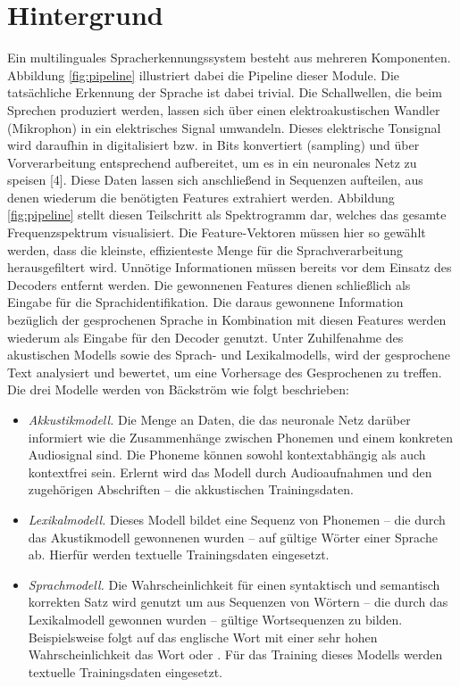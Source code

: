 \section{Hintergrund}
Ein multilinguales Spracherkennungssystem besteht aus mehreren Komponenten. Abbildung \ref{fig:pipeline} illustriert dabei die Pipeline dieser Module. Die tatsächliche Erkennung der Sprache ist dabei trivial. Die Schallwellen, die beim Sprechen produziert werden, lassen sich über einen elektroakustischen Wandler (Mikrophon) in ein elektrisches Signal umwandeln. Dieses elektrische Tonsignal wird daraufhin in digitalisiert bzw. in Bits konvertiert (sampling) und über Vorverarbeitung entsprechend aufbereitet, um es in ein neuronales Netz zu speisen [4]. Diese Daten lassen sich anschließend in Sequenzen aufteilen, aus denen wiederum die benötigten Features extrahiert werden. Abbildung \ref{fig:pipeline} stellt diesen Teilschritt als Spektrogramm dar, welches das gesamte Frequenzspektrum visualisiert. Die Feature-Vektoren müssen hier so gewählt werden, dass die kleinste, effizienteste Menge für die Sprachverarbeitung herausgefiltert wird. Unnötige Informationen müssen bereits vor dem Einsatz des Decoders entfernt werden. Die gewonnenen Features dienen schließlich als Eingabe für die Sprachidentifikation. Die daraus gewonnene Information bezüglich der gesprochenen Sprache in Kombination mit diesen Features werden wiederum als Eingabe für den Decoder genutzt. Unter Zuhilfenahme des akustischen Modells sowie des Sprach- und Lexikalmodells, wird der gesprochene Text analysiert und bewertet, um eine Vorhersage des Gesprochenen zu treffen.
Die drei Modelle werden von Bäckström \cite{Tom.2016} wie folgt beschrieben:

\begin{itemize}
    \item \textit{Akkustikmodell.} Die Menge an Daten, die das neuronale Netz darüber informiert wie die Zusammenhänge zwischen Phonemen und einem konkreten Audiosignal sind. Die Phoneme können
    sowohl kontextabhängig als auch kontextfrei sein.
    Erlernt wird das Modell durch Audioaufnahmen und den zugehörigen Abschriften – die akkustischen Trainingsdaten.
    \item \textit{Lexikalmodell.} Dieses Modell bildet eine Sequenz von Phonemen – die durch das Akustikmodell gewonnenen wurden – auf gültige Wörter einer Sprache ab. Hierfür werden textuelle Trainingsdaten eingesetzt.
    \item \textit{Sprachmodell.} Die Wahrscheinlichkeit für einen syntaktisch und semantisch korrekten Satz wird genutzt um aus Sequenzen von Wörtern – die durch das Lexikalmodell gewonnen wurden – gültige Wortsequenzen zu bilden.
    Beispielsweise folgt auf das englische Wort \grqq{} mit einer sehr hohen Wahrscheinlichkeit das Wort \grqq{} oder
    \grqq{}. Für das Training dieses Modells werden textuelle Trainingsdaten eingesetzt.
\end{itemize}

